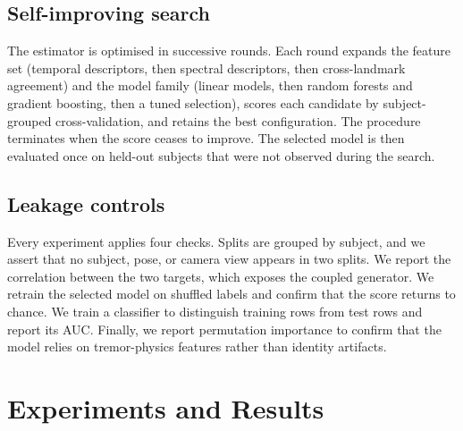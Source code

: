 \documentclass[conference]{IEEEtran}
\begin{document}
\subsection{Self-improving search}
The estimator is optimised in successive rounds. Each round expands the feature set
(temporal descriptors, then spectral descriptors, then cross-landmark agreement)
and the model family (linear models, then random forests and gradient boosting,
then a tuned selection), scores each candidate by subject-grouped cross-validation,
and retains the best configuration. The procedure terminates when the score ceases
to improve. The selected model is then evaluated once on held-out subjects that
were not observed during the search.

\subsection{Leakage controls}
Every experiment applies four checks. Splits are grouped by subject, and we assert
that no subject, pose, or camera view appears in two splits. We report the
correlation between the two targets, which exposes the coupled generator. We
retrain the selected model on shuffled labels and confirm that the score returns to
chance. We train a classifier to distinguish training rows from test rows and
report its AUC. Finally, we report permutation importance to confirm that the model
relies on tremor-physics features rather than identity artifacts.

\section{Experiments and Results}
\end{document}
